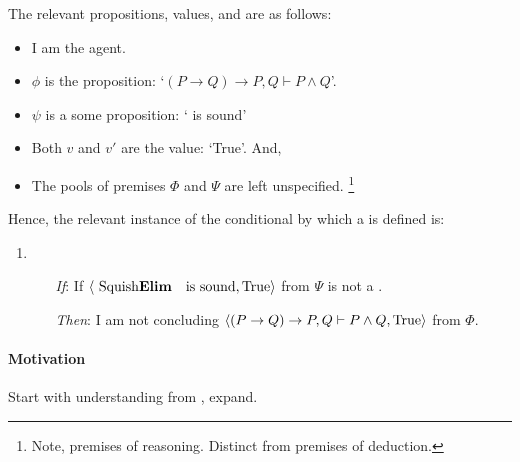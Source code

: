 \begin{note}
  The relevant propositions, values, and  are as follows:
  \begin{itemize}[noitemsep]
  \item
    I am the agent.
  \item
    \(\phi\) is the proposition: `\((P \rightarrow Q) \rightarrow P, Q \vdash P \land Q\)'.
  \item
    \(\psi\) is a some proposition: `\sqE{} is sound'
  \item
    Both \(v\) and \(v'\) are the value: `True'.
    And,
  \item
    The pools of premises \(\Phi\) and \(\Psi\) are left unspecified.%
    \footnote{
      Note, premises of reasoning.
      Distinct from premises of deduction.
    }
  \end{itemize}

  Hence, the relevant instance of the conditional by which a \requ{} is defined is:

  \begin{enumerate}[label=]
  \item
    \begin{itemize}
    \item[\emph{If}:]
      If \(\pv{\text{\sqE{} is sound}}{\text{True}}\) from \(\Psi\) is not a \fc{}.
    \item[\emph{Then}:]
      I am not concluding \(\langle (P \rightarrow Q) \rightarrow P, Q \vdash P \land Q, \text{True} \rangle\) from \(\Phi\).
    \end{itemize}
  \end{enumerate}
\end{note}

\paragraph{Motivation}

\begin{note}
  Start with understanding from , expand.
\end{note}

